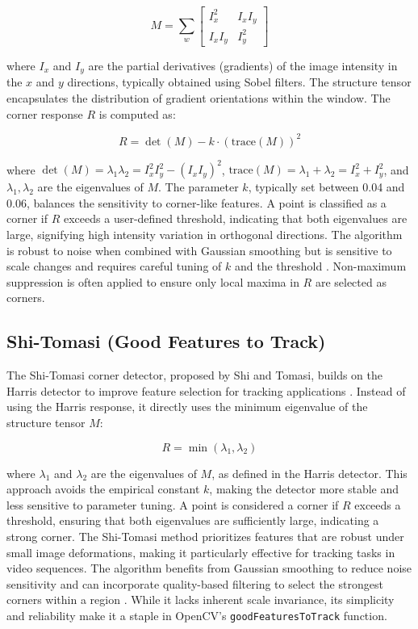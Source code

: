 \documentclass[journal]{IEEEtran}
\begin{document}
\begin{equation}
M = \sum_w \begin{bmatrix} I_x^2 & I_x I_y \\ I_x I_y & I_y^2 \end{bmatrix}
\end{equation}

where \( I_x \) and \( I_y \) are the partial derivatives (gradients) of the image intensity in the \( x \) and \( y \) directions, typically obtained using Sobel filters. The structure tensor encapsulates the distribution of gradient orientations within the window. The corner response \( R \) is computed as:

\begin{equation}
R = \det(M) - k \cdot (\text{trace}(M))^2
\end{equation}

where \( \det(M) = \lambda_1 \lambda_2 = I_x^2 I_y^2 - (I_x I_y)^2 \), \( \text{trace}(M) = \lambda_1 + \lambda_2 = I_x^2 + I_y^2 \), and \( \lambda_1, \lambda_2 \) are the eigenvalues of \( M \). The parameter \( k \), typically set between 0.04 and 0.06, balances the sensitivity to corner-like features. A point is classified as a corner if \( R \) exceeds a user-defined threshold, indicating that both eigenvalues are large, signifying high intensity variation in orthogonal directions. The algorithm is robust to noise when combined with Gaussian smoothing but is sensitive to scale changes and requires careful tuning of \( k \) and the threshold \cite{Harris_Corner}. Non-maximum suppression is often applied to ensure only local maxima in \( R \) are selected as corners.

\subsection{Shi-Tomasi (Good Features to Track)}
The Shi-Tomasi corner detector, proposed by Shi and Tomasi, builds on the Harris detector to improve feature selection for tracking applications \cite{Shi_Tomasi}. Instead of using the Harris response, it directly uses the minimum eigenvalue of the structure tensor \( M \):

\begin{equation}
R = \min(\lambda_1, \lambda_2)
\end{equation}

where \( \lambda_1 \) and \( \lambda_2 \) are the eigenvalues of \( M \), as defined in the Harris detector. This approach avoids the empirical constant \( k \), making the detector more stable and less sensitive to parameter tuning. A point is considered a corner if \( R \) exceeds a threshold, ensuring that both eigenvalues are sufficiently large, indicating a strong corner. The Shi-Tomasi method prioritizes features that are robust under small image deformations, making it particularly effective for tracking tasks in video sequences. The algorithm benefits from Gaussian smoothing to reduce noise sensitivity and can incorporate quality-based filtering to select the strongest corners within a region \cite{Shi_Tomasi}. While it lacks inherent scale invariance, its simplicity and reliability make it a staple in OpenCV’s \texttt{goodFeaturesToTrack} function.
\end{document}
